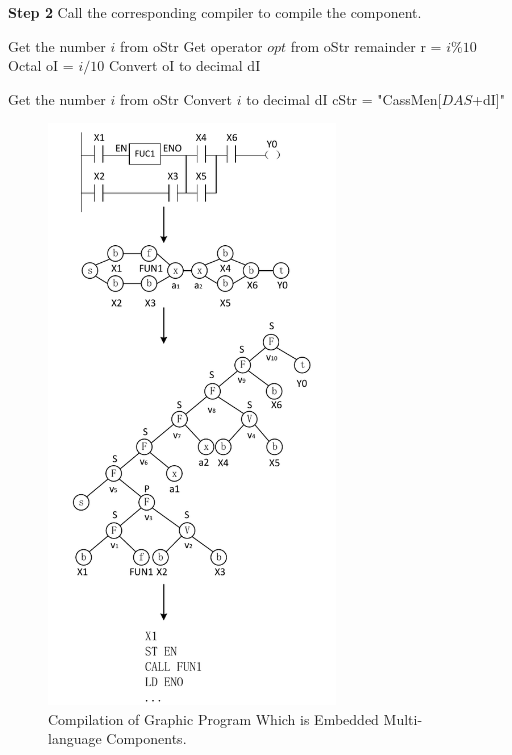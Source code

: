\documentclass[journal,UTF8]{IEEEtran}
\begin{document}
\textbf{Step 2} Call the corresponding compiler to compile the component.


\begin{algorithm}
	\label{alg1}
	\caption{$\mathcal{C}_m$}%
	Get the number $i$ from oStr\; 
	Get operator $opt$ from oStr\;
	remainder r = $i\%10$\;
	Octal oI =  $i/10$\;
	Convert oI to decimal dI\; 
\end{algorithm}
\begin{algorithm}
	\label{alg2}
	\caption{$\mathcal{C}_d$}%
	Get the number $i$ from oStr\; 
	Convert $i$ to decimal dI\; 
	cStr = "CassMen[$DAS$+dI]"\;
\end{algorithm}

\begin{figure}
	\centering
	\includegraphics[width=3in]{fig/Compile.pdf}
	\caption{Compilation of Graphic Program Which is Embedded Multi-language Components.}
	\label{fig:Compile}
\end{figure}
 
\end{document}
